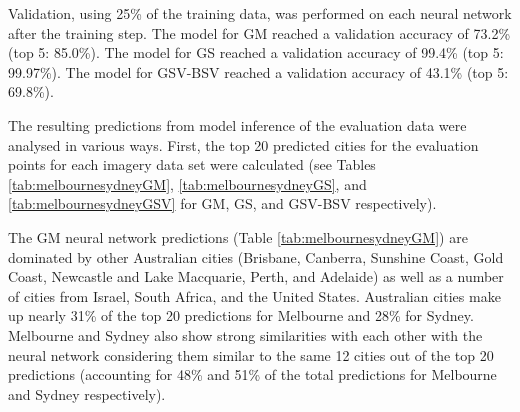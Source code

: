 \documentclass[10pt,letterpaper,hidelinks]{article}
\begin{document}
Validation, using 25\% of the training data, was performed on each neural network after the training step. The model for GM reached a validation accuracy of 73.2\% (top 5: 85.0\%). The model for GS reached a validation accuracy of 99.4\% (top 5: 99.97\%). The model for GSV-BSV reached a validation accuracy of 43.1\% (top 5: 69.8\%).

The resulting predictions from model inference of the evaluation data were analysed in various ways. First, the top 20 predicted cities for the evaluation points for each imagery data set were calculated (see Tables \ref{tab:melbournesydneyGM}, \ref{tab:melbournesydneyGS}, and \ref{tab:melbournesydneyGSV} for GM, GS, and GSV-BSV respectively).

The GM neural network predictions (Table \ref{tab:melbournesydneyGM}) are dominated by other Australian cities (Brisbane, Canberra, Sunshine Coast, Gold Coast, Newcastle and Lake Macquarie, Perth, and Adelaide) as well as a number of cities from Israel, South Africa, and the United States. Australian cities make up nearly 31\% of the top 20 predictions for Melbourne and 28\% for Sydney. Melbourne and Sydney also show strong similarities with each other with the neural network considering them similar to the same 12 cities out of the top 20 predictions (accounting for 48\% and 51\% of the total predictions for Melbourne and Sydney respectively).
\end{document}
